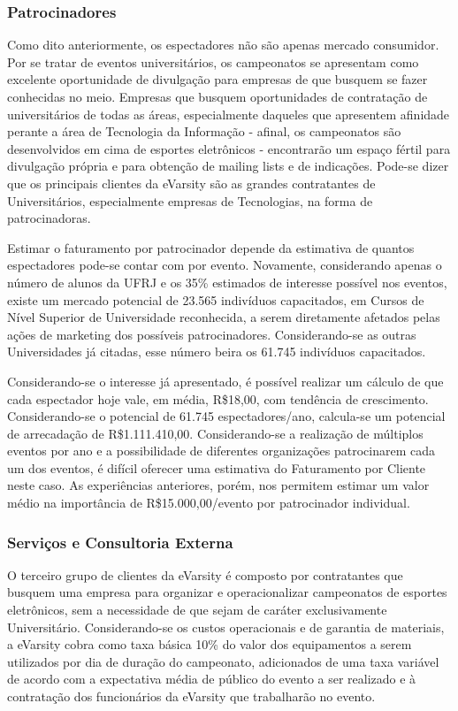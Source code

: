 \documentclass[a4paper, 12pt]{paper}
\begin{document}
\subsubsection{Patrocinadores}
Como dito anteriormente, os espectadores não são apenas mercado consumidor. Por se tratar de eventos universitários, os campeonatos se apresentam como excelente oportunidade de divulgação para empresas de que busquem se fazer conhecidas no meio. Empresas que busquem oportunidades de contratação de universitários de todas as áreas, especialmente daqueles que apresentem afinidade perante a área de Tecnologia da Informação - afinal, os campeonatos são desenvolvidos em cima de esportes eletrônicos - encontrarão um espaço fértil para divulgação própria e para obtenção de mailing lists e de indicações. Pode-se dizer que os principais clientes da eVarsity são as grandes contratantes de Universitários, especialmente empresas de Tecnologias, na forma de patrocinadoras.

Estimar o faturamento por patrocinador depende da estimativa de quantos espectadores pode-se contar com por evento. Novamente, considerando apenas o número de alunos da UFRJ e os 35\% estimados de interesse possível nos eventos, existe um mercado potencial de 23.565 indivíduos capacitados, em Cursos de Nível Superior de Universidade reconhecida, a serem diretamente afetados pelas ações de marketing dos possíveis patrocinadores. Considerando-se as outras Universidades já citadas, esse número beira os 61.745 indivíduos capacitados.

Considerando-se o interesse já apresentado, é possível realizar um cálculo de que cada espectador hoje vale, em média, R\$18,00, com tendência de crescimento. Considerando-se o potencial de 61.745 espectadores/ano, calcula-se um potencial de arrecadação de R\$1.111.410,00. Considerando-se a realização de múltiplos eventos por ano e a possibilidade de diferentes organizações patrocinarem cada um dos eventos, é difícil oferecer uma estimativa do Faturamento por Cliente neste caso. 
As experiências anteriores, porém, nos permitem estimar um valor médio na importância de R\$15.000,00/evento por patrocinador individual.

\subsubsection{Serviços e Consultoria Externa}
O terceiro grupo de clientes da eVarsity é composto por contratantes que busquem uma empresa para organizar e operacionalizar campeonatos de esportes eletrônicos, sem a necessidade de que sejam de caráter exclusivamente Universitário. Considerando-se os custos operacionais e de garantia de materiais, a eVarsity cobra como taxa básica 10\% do valor dos equipamentos a serem utilizados por dia de duração do campeonato, adicionados de uma taxa variável de acordo com a expectativa média de público do evento a ser realizado e à contratação dos funcionários da eVarsity que trabalharão no evento. 
\end{document}
